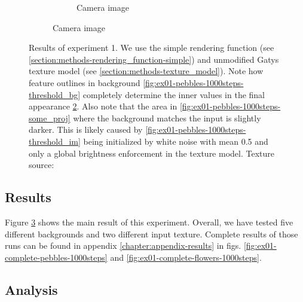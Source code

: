 \begin{figure}[]
\begin{subfigure}{\textwidth}
\begin{subfigure}{0.24\textwidth}
            \caption{Camera image}
            \label{fig:ex01-pebbles-1000steps-threshold_proj}
        \end{subfigure}
    \end{subfigure}
    \caption{Results of experiment 1. We use the simple rendering function (see \ref{section:methods-rendering_function-simple}) and unmodified Gatys texture model (see \ref{section:methods-texture_model}). Note how feature outlines in background \ref{fig:ex01-pebbles-1000steps-threshold_bg} completely determine the inner values in the final appearance \ref{fig:ex01-pebbles-1000steps-threshold_proj}. Also note that the area in \ref{fig:ex01-pebbles-1000steps-some_proj} where the background matches the input is slightly darker. This is likely caused by \ref{fig:ex01-pebbles-1000steps-threshold_im} being initialized by white noise with mean 0.5 and only a global brightness enforcement in the texture model. Texture source: \citet{Gatys2015}}
    \label{fig:ex01-pebbles-1000steps}
\end{figure}

\subsection{Results}
\label{section:results-experiments-01-results}

Figure \ref{fig:ex01-pebbles-1000steps} shows the main result of this experiment. Overall, we have tested five different backgrounds and two different input texture. Complete results of those runs can be found in appendix \ref{chapter:appendix-results} in figs. \ref{fig:ex01-complete-pebbles-1000steps} and \ref{fig:ex01-complete-flowers-1000steps}.

\subsection{Analysis}
\label{section:results-experiments-01-analysis}

